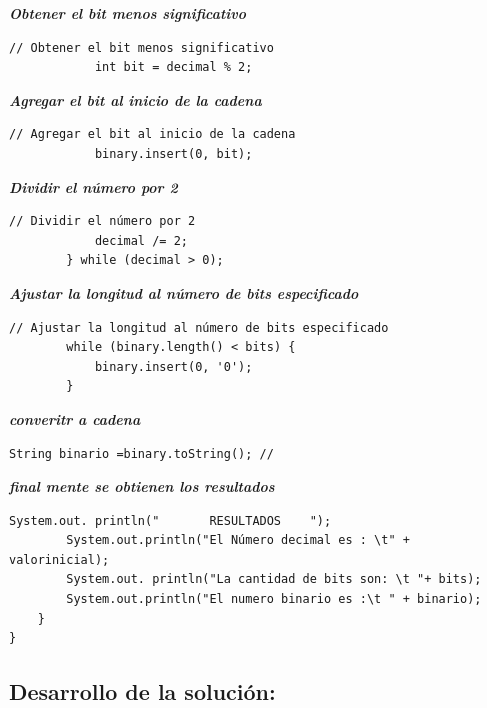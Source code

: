 \subsectionse\textbf{\textit{Obtener el bit menos significativo}}

\begin{lstlisting}[style=javaStyle]
  // Obtener el bit menos significativo
            int bit = decimal % 2;
\end{lstlisting}
\subsectionse\textbf{\textit{Agregar el bit al inicio de la cadena}}

\begin{lstlisting}[style=javaStyle]
  // Agregar el bit al inicio de la cadena
            binary.insert(0, bit);

\end{lstlisting}

\subsectionse\textbf{\textit{Dividir el número por 2}}

\begin{lstlisting}[style=javaStyle]
   // Dividir el número por 2
            decimal /= 2;
        } while (decimal > 0);

\end{lstlisting}

\subsectionse\textbf{\textit{Ajustar la longitud al número de bits especificado}}

\begin{lstlisting}[style=javaStyle]
    // Ajustar la longitud al número de bits especificado
        while (binary.length() < bits) {
            binary.insert(0, '0');
        }

\end{lstlisting}

\subsectionse\textbf{\textit{converitr a cadena}}

\begin{lstlisting}[style=javaStyle]
    String binario =binary.toString(); //

\end{lstlisting}
\subsectionse\textbf{\textit{final mente se obtienen los resultados}}

\begin{lstlisting}[style=javaStyle]
     System.out. println("       RESULTADOS    ");
        System.out.println("El Número decimal es : \t" + valorinicial);
        System.out. println("La cantidad de bits son: \t "+ bits);
        System.out.println("El numero binario es :\t " + binario);
    }       
}

\end{lstlisting}


\subsection{\textbf{Desarrollo de la solución:}}

